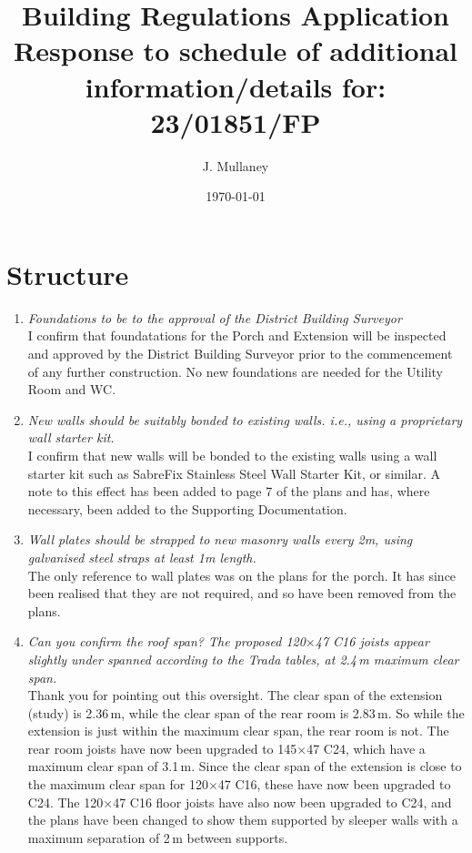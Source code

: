 \documentclass{extension}
\begin{document}
\title{Building Regulations Application \\[2mm]
Response to schedule of additional \\ information/details for: 23/01851/FP}
\author{J. Mullaney}
\date{\today}

\maketitle

\vspace{5mm}

\section{Structure}
\begin{enumerate}
\item {\it Foundations to be to the approval of the District Building Surveyor}\\
I confirm that foundatations for the Porch and Extension will be inspected and approved by the District Building Surveyor prior to the commencement of any further construction. No new foundations are needed for the Utility Room and WC.
\item {\it New walls should be suitably bonded to existing walls. i.e., using a proprietary wall starter kit.}\\
I confirm that new walls will be bonded to the existing walls using a wall starter kit such as SabreFix Stainless Steel Wall Starter Kit, or similar.\cite{starterkit} A note to this effect has been added to page 7 of the plans and has, where necessary, been added to the Supporting Documentation.
\item {\it Wall plates should be strapped to new masonry walls every 2m, using galvanised steel straps at least 1m length.}\\
The only reference to wall plates was on the plans for the porch. It has since been realised that they are not required, and so have been removed from the plans.
\item {\it Can you confirm the roof span? The proposed 120$\times$47 C16 joists appear slightly under spanned according to the Trada tables, at 2.4\,m maximum clear span.}\\
Thank you for pointing out this oversight. The clear span of the extension (study) is 2.36\,m, while the clear span of the rear room is 2.83\,m. So while the extension is just within the maximum clear span, the rear room is not. The rear room joists have now been upgraded to 145$\times$47 C24, which have a maximum clear span of 3.1\,m. Since the clear span of the extension is close to the maximum clear span for 120$\times$47 C16, these have now been upgraded to C24. The 120$\times$47 C16 floor joists have also now been upgraded to C24, and the plans have been changed to show them supported by sleeper walls with a maximum separation of 2\,m between supports.

\end{enumerate}
\end{document}
